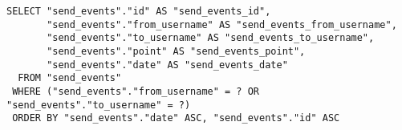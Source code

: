 \documentclass[../../../../main]{subfiles}
\begin{document}
    \begin{mdframed}
        \begin{verbatim}
SELECT "send_events"."id" AS "send_events_id",
       "send_events"."from_username" AS "send_events_from_username",
       "send_events"."to_username" AS "send_events_to_username",
       "send_events"."point" AS "send_events_point",
       "send_events"."date" AS "send_events_date"
  FROM "send_events"
 WHERE ("send_events"."from_username" = ? OR "send_events"."to_username" = ?)
 ORDER BY "send_events"."date" ASC, "send_events"."id" ASC
        \end{verbatim}
    \end{mdframed}
    \label{fig:streaming-chunk-sql}
\end{document}
